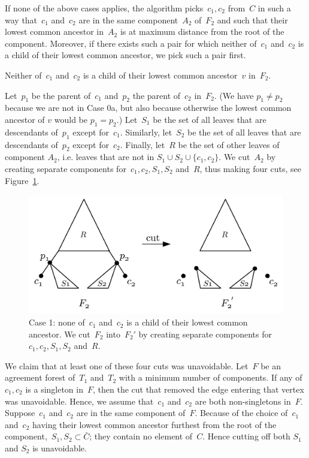 If none of the above cases applies, the algorithm picks~$c_1,c_2$ from~$C$ in such a way that~$c_1$ and~$c_2$ are in the same component~$A_2$ of~$F_2$ and such that their lowest common ancestor in~$A_2$ is at maximum distance from the root of the component. Moreover, if there exists such a pair for which neither of~$c_1$ and~$c_2$ is a child of their lowest common ancestor, we pick such a pair first.

\smallskip

 Neither of~$c_1$ and~$c_2$ is a child of their lowest common ancestor~$v$ in~$F_2$.

Let~$p_1$ be the parent of~$c_1$ and~$p_2$ the parent of~$c_2$ in~$F_2$. (We have $p_1\neq p_2$ because we are not in Case 0a, {but also because otherwise the lowest common ancestor of $v$ would be $p_1= p_2$}.) Let~$S_1$ be the set of all leaves that are descendants of~$p_1$ except for~$c_1$. Similarly, let~$S_2$ be the set of all leaves that are descendants of~$p_2$ except for~$c_2$. Finally, let~$R$ be the set of other leaves of component $A_2$, i.e. leaves that are not in $S_1\cup S_2\cup\{c_1,c_2\}$. We cut~$A_2$ by creating separate components for~$c_1,c_2,S_1,S_2$ and~$R$, thus making four cuts, see Figure~\ref{fig:case1}.

\begin{figure}
    \centering
    \includegraphics[scale=.7]{../figs/fig_case1}
    \caption{Case 1: none of~$c_1$ and~$c_2$ is a child of their lowest common ancestor. We cut~$F_2$ into~$F_2'$ by creating separate components for~$c_1,c_2,S_1,S_2$ and~$R$.\label{fig:case1}
    }
\end{figure}

We claim that at least one of these four cuts was unavoidable. Let~$F$ be an agreement forest of~$T_1$ and~$T_2$ with a minimum number of components. If any of~$c_1,c_2$ is a singleton in~$F$, then the cut that removed the edge entering that vertex was unavoidable. Hence, we assume that~$c_1$ and~$c_2$ are both non-singletons in~$F$. Suppose~$c_1$ and~$c_2$ are in the same component of~$F$. Because of the choice of~$c_1$ and~$c_2$ having their lowest common ancestor furthest from the root of the component,~$S_1,S_2\subset \bar{C}$; they contain no element of~$C$. Hence cutting off both $S_1$ and $S_2$ is unavoidable.

